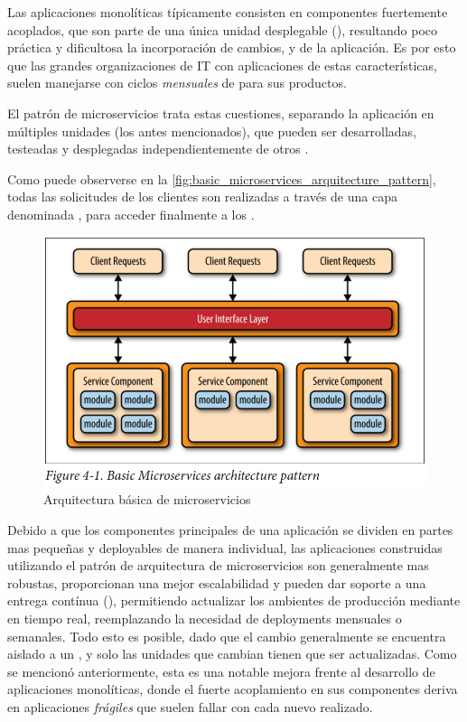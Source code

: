Las aplicaciones monolíticas típicamente consisten en componentes fuertemente acoplados, que son parte de una única unidad desplegable (), resultando poco práctica y dificultosa la incorporación de cambios,  y  de la aplicación. Es por esto que las grandes organizaciones de IT con aplicaciones de estas características, suelen manejarse con ciclos \textit{mensuales} de  para sus productos.

El patrón de microservicios trata estas cuestiones, separando la aplicación en múltiples unidades  (los  antes mencionados), que pueden ser desarrolladas, testeadas y desplegadas independientemente de otros .\cite[p.~27]{richards2015}

Como puede observerse en la \autoref{fig:basic_microservices_arquitecture_pattern}, todas las solicitudes de los clientes son realizadas a través de una capa denominada , para acceder finalmente a los .

\begin{figure}[H]
  \includegraphics[width=\linewidth]{src/images/02-capitulo-2/basic_microservices_arquitecture_pattern.png}
  \caption{Arquitectura básica de microservicios}
  \label{fig:basic_microservices_arquitecture_pattern}
\end{figure}

Debido a que los componentes principales de una aplicación se dividen en partes mas pequeñas y deployables de manera individual, las aplicaciones construidas utilizando el patrón de arquitectura de microservicios son generalmente mas robustas, proporcionan una mejor escalabilidad y pueden dar soporte a una entrega contínua (), permitiendo actualizar los ambientes de producción mediante  en tiempo real, reemplazando la necesidad de deployments mensuales o semanales. \cite[p.~33]{richards2015} Todo esto es posible, dado que el cambio generalmente se encuentra aislado a un , y solo las unidades que cambian tienen que ser actualizadas. Como se mencionó anteriormente, esta es una notable mejora frente al desarrollo de aplicaciones monolíticas, donde el fuerte acoplamiento en sus componentes deriva en aplicaciones \textit{frágiles} que suelen fallar con cada nuevo  realizado.

